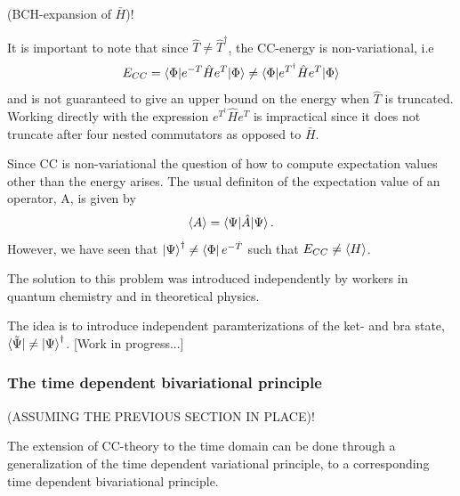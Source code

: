 \documentclass[aip,jcp,reprint,floatfix]{revtex4-1}
\begin{document}
    (BCH-expansion of $\bar{H}$)!
    
    It is important to note that since $\hat{T} \neq \hat{T}^\dagger$, the CC-energy is non-variational, i.e 
    \begin{equation}
        E_{CC} = \braket{\Phi|e^{-T}\hat{H}e^{T}|\Phi} \neq \braket{\Phi|e^{T^\dagger}\hat{H}e^{T}|\Phi} 
    \end{equation}
    and is not guaranteed to give an upper bound on the energy when $\hat{T}$ is truncated. Working directly with the expression $e^{T^\dagger}\hat{H}e^{T}$ is impractical since it does not truncate after four nested commutators as opposed to $\bar{H}$.
    
    Since CC is non-variational the question of how to compute expectation values other than the energy arises. The usual definiton of the expectation value of an operator, A, is given by 
    \begin{equation}
        \braket{A} = \braket{\Psi|\hat{A}|\Psi}.
    \end{equation}
    However, we have seen that $\ket{\Psi}^\dagger \neq \bra{\Phi}e^{-\hat{T}}$ such that $E_{CC} \neq \braket{H}$.
    
    The solution to this problem was introduced independently by workers in quantum chemistry and in theoretical physics\cite{VarCC_2013}.
    
    The idea is to introduce independent paramterizations of the ket- and bra state, $\bra{\tilde{\Psi}} \neq \ket{\Psi}^\dagger$. [Work in progress...]
    
    
    \subsubsection{The time dependent bivariational principle}
    (ASSUMING THE PREVIOUS SECTION IN PLACE)! 
    
    The extension of CC-theory to the time domain can be done through a generalization of the time dependent variational principle\cite{BECK2001}, to a corresponding time dependent bivariational principle\cite{OATDCC_2012}.
    
\end{document}
